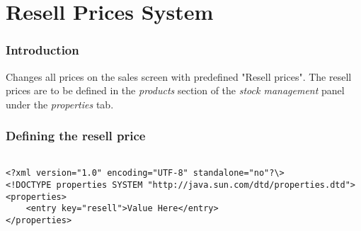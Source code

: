\section{Resell Prices System}

\subsubsection{Introduction}

Changes all prices on the sales screen with predefined "Resell prices". The resell prices are to be defined in the \textit{products} section of the \textit{stock management} panel under the \textit{properties} tab.

\subsubsection{Defining the resell price}

\begin{lstlisting}
	
<?xml version="1.0" encoding="UTF-8" standalone="no"?\>  
<!DOCTYPE properties SYSTEM "http://java.sun.com/dtd/properties.dtd">
<properties>
	<entry key="resell">Value Here</entry>
</properties>
	
\end{lstlisting}